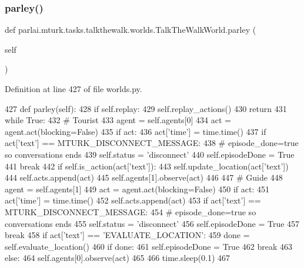\subsubsection{\texorpdfstring{parley()}{parley()}}
{\footnotesize\ttfamily def parlai.\+mturk.\+tasks.\+talkthewalk.\+worlds.\+Talk\+The\+Walk\+World.\+parley (\begin{DoxyParamCaption}\item[{}]{self }\end{DoxyParamCaption})}



Definition at line 427 of file worlds.\+py.


\begin{DoxyCode}
427     \textcolor{keyword}{def }parley(self):
428         \textcolor{keywordflow}{if} self.replay:
429             self.replay\_actions()
430             \textcolor{keywordflow}{return}
431         \textcolor{keywordflow}{while} \textcolor{keyword}{True}:
432             \textcolor{comment}{# Tourist}
433             agent = self.agents[0]
434             act = agent.act(blocking=\textcolor{keyword}{False})
435             \textcolor{keywordflow}{if} act:
436                 act[\textcolor{stringliteral}{'time'}] = time.time()
437                 \textcolor{keywordflow}{if} act[\textcolor{stringliteral}{'text'}] == MTURK\_DISCONNECT\_MESSAGE:
438                     \textcolor{comment}{# episode\_done=true so conversations ends}
439                     self.status = \textcolor{stringliteral}{'disconnect'}
440                     self.episodeDone = \textcolor{keyword}{True}
441                     \textcolor{keywordflow}{break}
442                 \textcolor{keywordflow}{if} self.is\_action(act[\textcolor{stringliteral}{'text'}]):
443                     self.update\_location(act[\textcolor{stringliteral}{'text'}])
444                 self.acts.append(act)
445                 self.agents[1].observe(act)
446 
447             \textcolor{comment}{# Guide}
448             agent = self.agents[1]
449             act = agent.act(blocking=\textcolor{keyword}{False})
450             \textcolor{keywordflow}{if} act:
451                 act[\textcolor{stringliteral}{'time'}] = time.time()
452                 self.acts.append(act)
453                 \textcolor{keywordflow}{if} act[\textcolor{stringliteral}{'text'}] == MTURK\_DISCONNECT\_MESSAGE:
454                     \textcolor{comment}{# episode\_done=true so conversations ends}
455                     self.status = \textcolor{stringliteral}{'disconnect'}
456                     self.episodeDone = \textcolor{keyword}{True}
457                     \textcolor{keywordflow}{break}
458                 \textcolor{keywordflow}{if} act[\textcolor{stringliteral}{'text'}] == \textcolor{stringliteral}{'EVALUATE\_LOCATION'}:
459                     done = self.evaluate\_location()
460                     \textcolor{keywordflow}{if} done:
461                         self.episodeDone = \textcolor{keyword}{True}
462                         \textcolor{keywordflow}{break}
463                 \textcolor{keywordflow}{else}:
464                     self.agents[0].observe(act)
465 
466             time.sleep(0.1)
467 
\end{DoxyCode}
